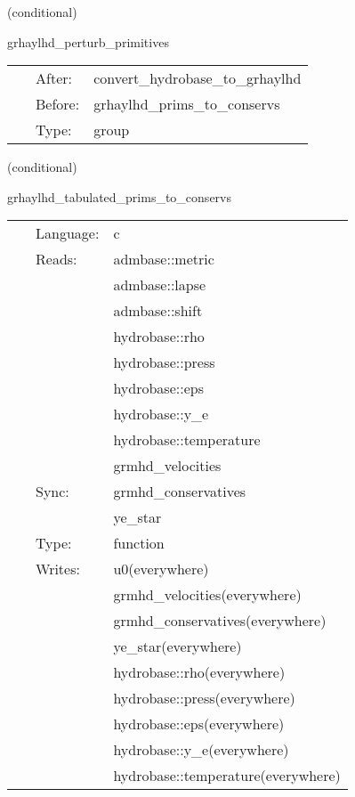 \documentclass{article}
\begin{document}
\vspace{5mm}

   (conditional) 

\hspace{5mm} grhaylhd\_perturb\_primitives 

\hspace{5mm}{\it perturb initial primitive data } 


\hspace{5mm}

 \begin{tabular*}{160mm}{cll} 
~ & After:  & convert\_hydrobase\_to\_grhaylhd \\ 
~ & Before:  & grhaylhd\_prims\_to\_conservs \\ 
~ & Type:  & group \\ 
\end{tabular*} 


\vspace{5mm}

   (conditional) 

\hspace{5mm} grhaylhd\_tabulated\_prims\_to\_conservs 

\hspace{5mm}{\it tabulated version of grhaylhd\_prims\_to\_conservs } 


\hspace{5mm}

 \begin{tabular*}{160mm}{cll} 
~ & Language:  & c \\ 
~ & Reads:  & admbase::metric \\ 
~& ~ &admbase::lapse\\ 
~& ~ &admbase::shift\\ 
~& ~ &hydrobase::rho\\ 
~& ~ &hydrobase::press\\ 
~& ~ &hydrobase::eps\\ 
~& ~ &hydrobase::y\_e\\ 
~& ~ &hydrobase::temperature\\ 
~& ~ &grmhd\_velocities\\ 
~ & Sync:  & grmhd\_conservatives \\ 
~& ~ &ye\_star\\ 
~ & Type:  & function \\ 
~ & Writes:  & u0(everywhere) \\ 
~& ~ &grmhd\_velocities(everywhere)\\ 
~& ~ &grmhd\_conservatives(everywhere)\\ 
~& ~ &ye\_star(everywhere)\\ 
~& ~ &hydrobase::rho(everywhere)\\ 
~& ~ &hydrobase::press(everywhere)\\ 
~& ~ &hydrobase::eps(everywhere)\\ 
~& ~ &hydrobase::y\_e(everywhere)\\ 
~& ~ &hydrobase::temperature(everywhere)\\ 
\end{tabular*} 
\end{document}

